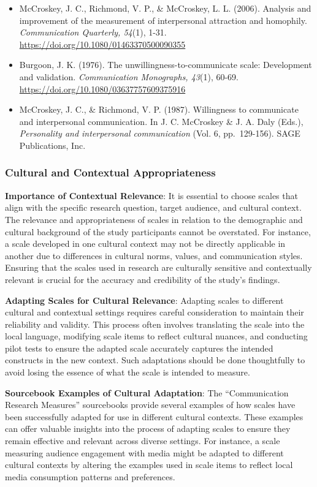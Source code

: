 \documentclass[
]{book}
\begin{document}
\begin{itemize}
\item
  McCroskey, J. C., Richmond, V. P., \& McCroskey, L. L. (2006). Analysis and improvement of the measurement of interpersonal attraction and homophily. \emph{Communication Quarterly, 54}(1), 1-31. \url{https://doi.org/10.1080/01463370500090355}
\item
  Burgoon, J. K. (1976). The unwillingness-to-communicate scale: Development and validation. \emph{Communication Monographs, 43}(1), 60-69. \url{https://doi.org/10.1080/03637757609375916}
\item
  McCroskey, J. C., \& Richmond, V. P. (1987). Willingness to communicate and interpersonal communication. In J. C. McCroskey \& J. A. Daly (Eds.), \emph{Personality and interpersonal communication} (Vol. 6, pp.~129-156). SAGE Publications, Inc.
\end{itemize}

\subsubsection*{Cultural and Contextual Appropriateness}\label{cultural-and-contextual-appropriateness}

\textbf{Importance of Contextual Relevance}: It is essential to choose scales that align with the specific research question, target audience, and cultural context. The relevance and appropriateness of scales in relation to the demographic and cultural background of the study participants cannot be overstated. For instance, a scale developed in one cultural context may not be directly applicable in another due to differences in cultural norms, values, and communication styles. Ensuring that the scales used in research are culturally sensitive and contextually relevant is crucial for the accuracy and credibility of the study's findings.

\textbf{Adapting Scales for Cultural Relevance}: Adapting scales to different cultural and contextual settings requires careful consideration to maintain their reliability and validity. This process often involves translating the scale into the local language, modifying scale items to reflect cultural nuances, and conducting pilot tests to ensure the adapted scale accurately captures the intended constructs in the new context. Such adaptations should be done thoughtfully to avoid losing the essence of what the scale is intended to measure.

\textbf{Sourcebook Examples of Cultural Adaptation}: The ``Communication Research Measures'' sourcebooks provide several examples of how scales have been successfully adapted for use in different cultural contexts. These examples can offer valuable insights into the process of adapting scales to ensure they remain effective and relevant across diverse settings. For instance, a scale measuring audience engagement with media might be adapted to different cultural contexts by altering the examples used in scale items to reflect local media consumption patterns and preferences.
\end{document}
